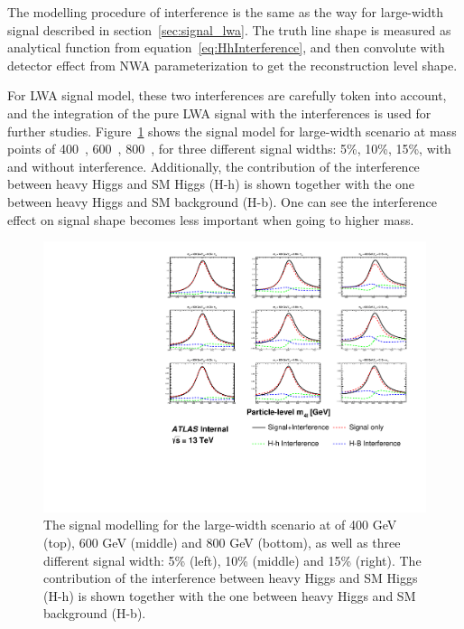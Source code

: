 The modelling procedure of interference is the same as the way for large-width signal described in section~\ref{sec:signal_lwa}.
The truth line shape is measured as analytical function from equation~\ref{eq:HhInterference}, and then convolute with detector effect from NWA parameterization to get the reconstruction level shape.

For LWA signal model, these two interferences are carefully token into account, and the integration of the pure LWA signal with the interferences is used for further studies.
Figure~\ref{fig:LWASignalModel} shows the signal model for large-width scenario at mass points of 400~\gev, 600~\gev, 800~\gev, for three different signal widths: 5\%, 10\%, 15\%, with and without interference.
Additionally, the contribution of the interference between heavy Higgs and SM Higgs (H-h) is shown together with the one between heavy Higgs and SM \ggZZ background (H-b).
One can see the interference effect on signal shape becomes less important when going to higher mass.

\begin{figure}[htbp]
    \centering
    \includegraphics[width=1.0\textwidth]{figures/HMHZZ/signal/LWA/LWAModel.pdf}
    \caption{The signal modelling for the large-width scenario at \mH of 400 GeV (top), 600 GeV (middle) and 800 GeV (bottom), as well as three different signal width:  5\%  (left), 10\%  (middle) and 15\% (right). 
    The contribution of the interference between heavy Higgs and SM Higgs (H-h) is shown together with the one between heavy Higgs and SM \ggZZ background (H-b).}
    \label{fig:LWASignalModel}
\end{figure}




